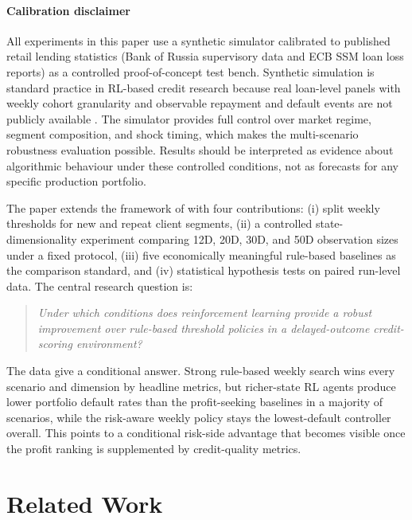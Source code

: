\documentclass[preprint,review,authoryear,12pt]{elsarticle}
\begin{document}
\paragraph{Calibration disclaimer}
All experiments in this paper use a synthetic simulator calibrated to published retail
lending statistics (Bank of Russia supervisory data and ECB SSM loan loss reports) as
a controlled proof-of-concept test bench. Synthetic simulation is standard practice in
RL-based credit research because real loan-level panels with weekly cohort granularity
and observable repayment and default events are not publicly available
\citep{herasymovych2019, lessmann2015}. The simulator provides full control over market
regime, segment composition, and shock timing, which makes the multi-scenario
robustness evaluation possible. Results should be interpreted as evidence about
algorithmic behaviour under these controlled conditions, not as forecasts for any
specific production portfolio.

The paper extends the framework of \citet{herasymovych2019} with four contributions:
(i) split weekly thresholds for new and repeat client segments, (ii) a controlled
state-dimensionality experiment comparing 12D, 20D, 30D, and 50D observation sizes
under a fixed protocol, (iii) five economically meaningful rule-based baselines as the
comparison standard, and (iv) statistical hypothesis tests on paired run-level data.
The central research question is:
\begin{quote}
    \emph{Under which conditions does reinforcement learning provide a robust improvement
        over rule-based threshold policies in a delayed-outcome credit-scoring environment?}
\end{quote}
The data give a conditional answer. Strong rule-based weekly search wins every scenario
and dimension by headline metrics, but richer-state RL agents produce lower portfolio
default rates than the profit-seeking baselines in a majority of scenarios, while the
risk-aware weekly policy stays the lowest-default controller overall. This points to a
conditional risk-side advantage that becomes visible once the profit ranking is
supplemented by credit-quality metrics.

\section{Related Work}
\end{document}
